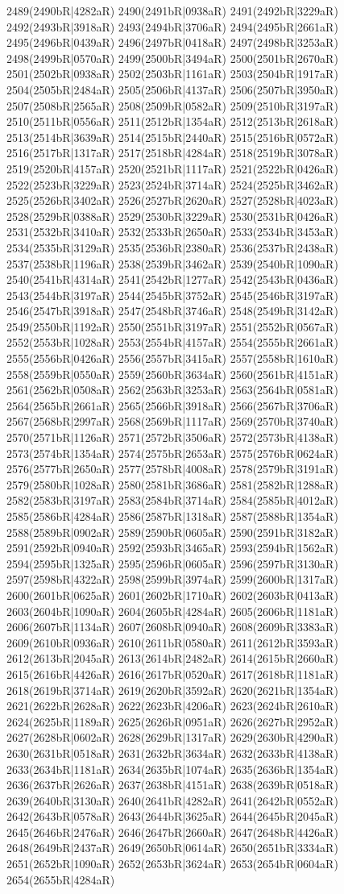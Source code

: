 2489(2490bR|4282aR) 2490(2491bR|0938aR) 2491(2492bR|3229aR) 2492(2493bR|3918aR) 2493(2494bR|3706aR) 2494(2495bR|2661aR) 2495(2496bR|0439aR) 2496(2497bR|0418aR) 2497(2498bR|3253aR) 2498(2499bR|0570aR) 2499(2500bR|3494aR) 2500(2501bR|2670aR) 2501(2502bR|0938aR) 2502(2503bR|1161aR) 2503(2504bR|1917aR) 2504(2505bR|2484aR) 2505(2506bR|4137aR) 2506(2507bR|3950aR) 2507(2508bR|2565aR) 2508(2509bR|0582aR) 2509(2510bR|3197aR) 2510(2511bR|0556aR) 2511(2512bR|1354aR) 2512(2513bR|2618aR) 2513(2514bR|3639aR) 2514(2515bR|2440aR) 2515(2516bR|0572aR) 2516(2517bR|1317aR) 2517(2518bR|4284aR) 2518(2519bR|3078aR) 2519(2520bR|4157aR) 2520(2521bR|1117aR) 2521(2522bR|0426aR) 2522(2523bR|3229aR) 2523(2524bR|3714aR) 2524(2525bR|3462aR) 2525(2526bR|3402aR) 2526(2527bR|2620aR) 2527(2528bR|4023aR) 2528(2529bR|0388aR) 2529(2530bR|3229aR) 2530(2531bR|0426aR) 2531(2532bR|3410aR) 2532(2533bR|2650aR) 2533(2534bR|3453aR) 2534(2535bR|3129aR) 2535(2536bR|2380aR) 2536(2537bR|2438aR) 2537(2538bR|1196aR) 2538(2539bR|3462aR) 2539(2540bR|1090aR) 2540(2541bR|4314aR) 2541(2542bR|1277aR) 2542(2543bR|0436aR) 2543(2544bR|3197aR) 2544(2545bR|3752aR) 2545(2546bR|3197aR) 2546(2547bR|3918aR) 2547(2548bR|3746aR) 2548(2549bR|3142aR) 2549(2550bR|1192aR) 2550(2551bR|3197aR) 2551(2552bR|0567aR) 2552(2553bR|1028aR) 2553(2554bR|4157aR) 2554(2555bR|2661aR) 2555(2556bR|0426aR) 2556(2557bR|3415aR) 2557(2558bR|1610aR) 2558(2559bR|0550aR) 2559(2560bR|3634aR) 2560(2561bR|4151aR) 2561(2562bR|0508aR) 2562(2563bR|3253aR) 2563(2564bR|0581aR) 2564(2565bR|2661aR) 2565(2566bR|3918aR) 2566(2567bR|3706aR) 2567(2568bR|2997aR) 2568(2569bR|1117aR) 2569(2570bR|3740aR) 2570(2571bR|1126aR) 2571(2572bR|3506aR) 2572(2573bR|4138aR) 2573(2574bR|1354aR) 2574(2575bR|2653aR) 2575(2576bR|0624aR) 2576(2577bR|2650aR) 2577(2578bR|4008aR) 2578(2579bR|3191aR) 2579(2580bR|1028aR) 2580(2581bR|3686aR) 2581(2582bR|1288aR) 2582(2583bR|3197aR) 2583(2584bR|3714aR) 2584(2585bR|4012aR) 2585(2586bR|4284aR) 2586(2587bR|1318aR) 2587(2588bR|1354aR) 2588(2589bR|0902aR) 2589(2590bR|0605aR) 2590(2591bR|3182aR) 2591(2592bR|0940aR) 2592(2593bR|3465aR) 2593(2594bR|1562aR) 2594(2595bR|1325aR) 2595(2596bR|0605aR) 2596(2597bR|3130aR) 2597(2598bR|4322aR) 2598(2599bR|3974aR) 2599(2600bR|1317aR) 2600(2601bR|0625aR) 2601(2602bR|1710aR) 2602(2603bR|0413aR) 2603(2604bR|1090aR) 2604(2605bR|4284aR) 2605(2606bR|1181aR) 2606(2607bR|1134aR) 2607(2608bR|0940aR) 2608(2609bR|3383aR) 2609(2610bR|0936aR) 2610(2611bR|0580aR) 2611(2612bR|3593aR) 2612(2613bR|2045aR) 2613(2614bR|2482aR) 2614(2615bR|2660aR) 2615(2616bR|4426aR) 2616(2617bR|0520aR) 2617(2618bR|1181aR) 2618(2619bR|3714aR) 2619(2620bR|3592aR) 2620(2621bR|1354aR) 2621(2622bR|2628aR) 2622(2623bR|4206aR) 2623(2624bR|2610aR) 2624(2625bR|1189aR) 2625(2626bR|0951aR) 2626(2627bR|2952aR) 2627(2628bR|0602aR) 2628(2629bR|1317aR) 2629(2630bR|4290aR) 2630(2631bR|0518aR) 2631(2632bR|3634aR) 2632(2633bR|4138aR) 2633(2634bR|1181aR) 2634(2635bR|1074aR) 2635(2636bR|1354aR) 2636(2637bR|2626aR) 2637(2638bR|4151aR) 2638(2639bR|0518aR) 2639(2640bR|3130aR) 2640(2641bR|4282aR) 2641(2642bR|0552aR) 2642(2643bR|0578aR) 2643(2644bR|3625aR) 2644(2645bR|2045aR) 2645(2646bR|2476aR) 2646(2647bR|2660aR) 2647(2648bR|4426aR) 2648(2649bR|2437aR) 2649(2650bR|0614aR) 2650(2651bR|3334aR) 2651(2652bR|1090aR) 2652(2653bR|3624aR) 2653(2654bR|0604aR) 2654(2655bR|4284aR) 